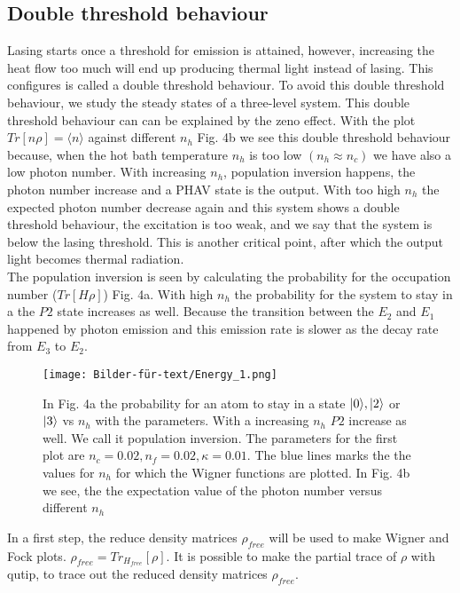 \documentclass[12pt,a4paper]{article}
\DeclarePairedDelimiter\ket{\lvert}{\rangle}
\begin{document}
\subsection{Double threshold behaviour}
Lasing starts once a threshold for emission is attained, however, increasing the heat flow too much will end up producing  thermal light instead of lasing. This configures is called a double threshold behaviour.
To avoid this double threshold behaviour, we study the steady states of a three-level system.
This double threshold behaviour can can be explained by the zeno effect. 
With the plot  $Tr[n\rho] =\langle n\rangle$ against different $n_h$ Fig. 4b we see this double threshold behaviour because, when the hot bath temperature $n_h$ is too low $(n_h \approx n_c)$ we have also a  low photon number. With increasing $n_h$, population inversion happens, the photon number increase and a PHAV state is the output. With too high $n_h$ the expected photon number decrease again and this system shows a double threshold behaviour, the excitation is too weak, and we say that the system is below the lasing threshold. This is another critical point, after which the output light becomes thermal radiation.\\
The population inversion is seen by calculating the probability for the occupation number ($Tr[H \rho]$) Fig. 4a.  With high $n_h$ the probability for the system to stay in a the $P2$ state increases as well. Because the transition between the $E_2$ and $E_1$ happened by photon emission and this emission rate is slower as the decay rate from $E_3$ to $E_2$. 
\begin{figure}[h!]
\hspace{-1cm}
\texttt{[image: Bilder-für-text/Energy\_1.png]}
\caption{In Fig. 4a the probability for an atom to stay in a state $\ket{0}, \ket{2}$ or $\ket{3}$ vs $n_h$ with the parameters. With a increasing $n_h$ $P2$ increase as well. We call it population inversion.  The parameters for the first plot are $n_c=0.02 ,n_f=0.02,\kappa=0.01 $. The blue lines marks the the values for $ n_h$ for which the Wigner functions are plotted. In Fig. 4b we see, the the expectation value of the photon number versus different $n_h$ }
\end{figure}
\newpage
In a first step, the reduce density matrices $\rho_{free}$ will be used to make Wigner and Fock plots.
$\rho_{free}=Tr_{H_{free}}[\rho]$.
It is possible to make the partial trace of $\rho$ with qutip, to trace out the reduced density matrices $\rho_{free}$. 
\end{document}
